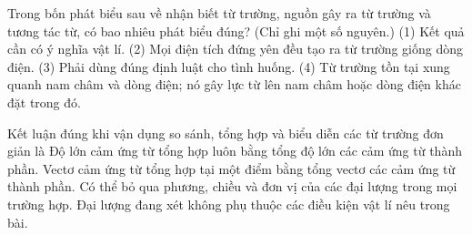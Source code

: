 \begin{ex}
Trong bốn phát biểu sau về nhận biết từ trường, nguồn gây ra từ trường và tương tác từ, có bao nhiêu phát biểu đúng? (Chỉ ghi một số nguyên.) (1) Kết quả cần có ý nghĩa vật lí. (2) Mọi điện tích đứng yên đều tạo ra từ trường giống dòng điện. (3) Phải dùng đúng định luật cho tình huống. (4) Từ trường tồn tại xung quanh nam châm và dòng điện; nó gây lực từ lên nam châm hoặc dòng điện khác đặt trong đó.
\end{ex}

\begin{ex}
Kết luận đúng khi vận dụng so sánh, tổng hợp và biểu diễn các từ trường đơn giản là
\choice
{Độ lớn cảm ứng từ tổng hợp luôn bằng tổng độ lớn các cảm ứng từ thành phần.}
{\True Vectơ cảm ứng từ tổng hợp tại một điểm bằng tổng vectơ các cảm ứng từ thành phần.}
{Có thể bỏ qua phương, chiều và đơn vị của các đại lượng trong mọi trường hợp.}
{Đại lượng đang xét không phụ thuộc các điều kiện vật lí nêu trong bài.}
\end{ex}

